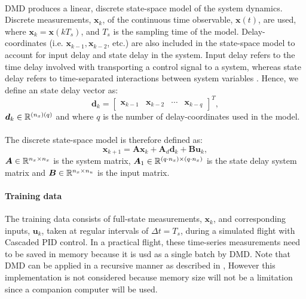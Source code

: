         \paragraph{}
        DMD produces a linear, discrete state-space model of the system dynamics.
        Discrete measurements, $\bm{x}_k$, of the continuous time observable, $\bm{x}(t)$, are used, 
        where $\bm{x}_k = \bm{x}(k T_s)$, and $T_s$ is the sampling time of the model.    
        Delay-coordinates (i.e. $\bm{x}_{k-1}, \bm{x}_{k-2}$, etc.) are also included in the state-space model to
        account for input delay and state delay in the system.
        Input delay refers to the time delay involved with transporting a control signal to a system, 
        whereas state delay refers to time-separated interactions between system variables \cite{Chen1999}.
        Hence, we define an state delay vector as:
        \begin{equation}
            \bm{d}_{k} = 
            \begin{bmatrix}
                \bm{x}_{k-1} & \bm{x}_{k-2} & \cdots & \bm{x}_{k-q}
            \end{bmatrix}^T ,
        \end{equation}
        $\bm{d}_k \in \mathbb{R}^{(n_x)(q)}$ and where $q$ is the number of delay-coordinates used in the model.
        
        \paragraph{}
        The discrete state-space model is therefore defined as:
        \begin{equation} \label{eq:dmd_state_space}
            \bm{x}_{k+1} = \bm{A} \bm{x}_k + \bm{A}_d \bm{d}_k + \bm{B} \bm{u}_k ,
        \end{equation}
        \( \bm{A} \in \mathbb{R}^{n_x \times n_x} \) is the system matrix, 
        \( \bm{A}_1 \in \mathbb{R}^{(q \cdot n_x) \times (q \cdot n_x)} \) is the state delay system matrix and 
        \( \bm{B} \in \mathbb{R}^{n_x \times n_u} \) is the input matrix.
        
        \paragraph{Training data}
        The training data consists of full-state measurements, $\bm{x}_k$, and corresponding inputs, $\bm{u}_k$, 
        taken at regular intervals of $\Delta t = T_s$, during a simulated flight with Cascaded PID control.
        In a practical flight, these time-series measurements need to be saved in memory because it is usd as a single batch by DMD.
        Note that DMD can be applied in a recursive manner as described in \cite{Noack2016}, 
        However this implementation is not considered because memory size will not be a limitation since a companion computer will be used.
        
